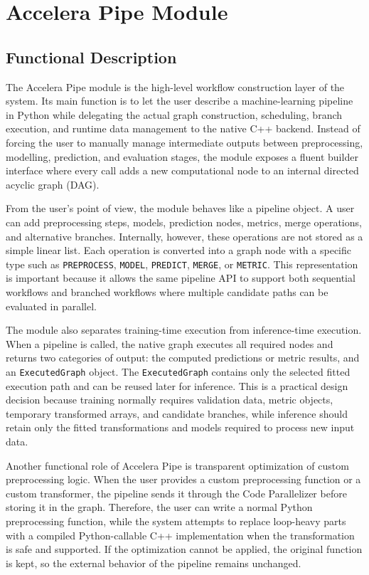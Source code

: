 \section{Accelera Pipe Module}

\subsection{Functional Description}

The Accelera Pipe module is the high-level workflow construction layer of the
system. Its main function is to let the user describe a machine-learning
pipeline in Python while delegating the actual graph construction, scheduling,
branch execution, and runtime data management to the native C++ backend. Instead
of forcing the user to manually manage intermediate outputs between
preprocessing, modelling, prediction, and evaluation stages, the module exposes a
fluent builder interface where every call adds a new computational node to an
internal directed acyclic graph (DAG).

From the user's point of view, the module behaves like a pipeline object. A user
can add preprocessing steps, models, prediction nodes, metrics, merge operations,
and alternative branches. Internally, however, these operations are not stored as
a simple linear list. Each operation is converted into a graph node with a
specific type such as \texttt{PREPROCESS}, \texttt{MODEL}, \texttt{PREDICT},
\texttt{MERGE}, or \texttt{METRIC}. This representation is important because it
allows the same pipeline API to support both sequential workflows and branched
workflows where multiple candidate paths can be evaluated in parallel.

The module also separates training-time execution from inference-time execution.
When a pipeline is called, the native graph executes all required nodes and
returns two categories of output: the computed predictions or metric results,
and an \texttt{ExecutedGraph} object. The \texttt{ExecutedGraph} contains only
the selected fitted execution path and can be reused later for inference. This is
a practical design decision because training normally requires validation data,
metric objects, temporary transformed arrays, and candidate branches, while
inference should retain only the fitted transformations and models required to
process new input data.

Another functional role of Accelera Pipe is transparent optimization of custom
preprocessing logic. When the user provides a custom preprocessing function or a
custom transformer, the pipeline sends it through the Code Parallelizer before
storing it in the graph. Therefore, the user can write a normal Python
preprocessing function, while the system attempts to replace loop-heavy parts
with a compiled Python-callable C++ implementation when the transformation is
safe and supported. If the optimization cannot be applied, the original function
is kept, so the external behavior of the pipeline remains unchanged.

